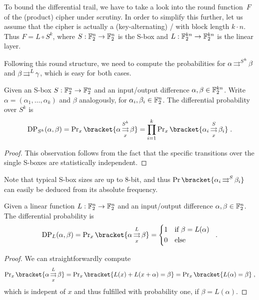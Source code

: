 To bound the differential trail, we have to take a look into the round function~$F$ of the (product) cipher under scrutiny.
In order to simplify this further, let us assume that the cipher is actually a (key-alternating) \SPN/ with block length $k \cdot n$.
Thus $F = L \circ S^k$, where $S : \mathbb{F}_2^n \to \mathbb{F}_2^n$ is the S-box and $L : \mathbb{F}_2^{kn} \to \mathbb{F}_2^{kn}$ is the linear layer.

Following this round structure, we need to compute the probabilities for $\alpha \operatorname*{\rightrightarrows}^{S^k}_{} \beta$ and $\beta \operatorname*{\rightrightarrows}^{L}_{} \gamma$, which is easy for both cases.
\begin{lemma}\label{lem:dp-sbox}
    Given an S-box $S : \mathbb{F}_2^{n} \to \mathbb{F}_2^{n}$ and an input/output difference $\alpha, \beta \in \mathbb{F}_2^{kn}$.
    Write $\alpha = (\alpha_1, \ldots, \alpha_k)$ and $\beta$ analogously, for $\alpha_i, \beta_i \in \mathbb{F}_2^n$.
    The differential probability over $S^k$ is
    \begin{equation*}
        \mathrm{DP}_{S^k}(\alpha, \beta) = \Prob_x\bracket{\propDiff{\alpha}{S^k}{x}{\beta}} = \prod_{i=1}^k \Prob_x\bracket{\propDiff{\alpha_i}{S}{x}{\beta_i}}\;.
    \end{equation*}
\end{lemma}
\begin{proof}
    This observation follows from the fact that the specific transitions over the single S-boxes are statistically independent.
\end{proof}
Note that typical S-box sizes are up to $8$-bit, and thus $\Prob\bracket{\propDiff{\alpha_i}{S}{}{\beta_i}}$ can easily be deduced from its absolute frequency.
\begin{lemma}\label{lem:dp-llayer}
    Given a linear function $L : \mathbb{F}_2^{n} \to \mathbb{F}_2^{n}$ and an input/output difference $\alpha, \beta \in \mathbb{F}_2^n$.
    The differential probability is
    \begin{equation*}
        \mathrm{DP}_L(\alpha, \beta) = \Prob_x\bracket{\propDiff{\alpha}{L}{x}{\beta}} = \begin{cases*}
            1 & if $\beta = L(\alpha)$ \\
            0 & else
        \end{cases*}\;.
    \end{equation*}
\end{lemma}
\begin{proof}
    We can straightforwardly compute
    \begin{equation*}
        \Prob_x\bracket{\propDiff{\alpha}{L}{x}{\beta}} = \Prob_x\bracket{L(x) + L(x+\alpha) = \beta} = \Prob_x\bracket{L(\alpha) = \beta}\;,
    \end{equation*}
    which is indepent of $x$ and thus fulfilled with probability one, if $\beta = L(\alpha)$.
\end{proof}

